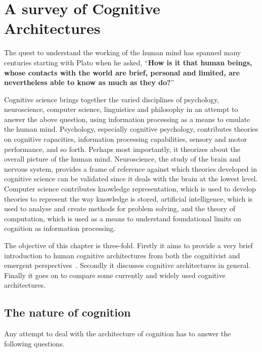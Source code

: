 \chapter{A survey of Cognitive Architectures}
\label{The_nature_of_cognition}
\newcommand{\soar}{{\small Soar\ }}
\newcommand{\actr}{{\small ACT-R\ }}
\newcommand{\epic}{{\small EPIC\ }}
\newcommand{\clarion}{{\small CLARION\ }}
The quest to understand the working of the human mind has spanned
many centuries starting with Plato when he asked, 
%
%
``{\bf How is it that human beings, whose contacts with the world are
  brief, personal and limited, are nevertheless able to know as much
  as they do?}''~\cite{Bogdan:1993aa}

Cognitive science brings together the varied disciplines of
psychology, neuroscience, computer science, linguistics and philosophy
in an attempt to answer the above question, using information
processing as a means to emulate the human mind. Psychology,
especially cognitive psychology, contributes theories on cognitive
capacities, information processing capabilities, sensory and motor
performance, and so forth.  Perhaps most importantly, it theorizes
about the overall picture of the human mind. Neuroscience, the study
of the brain and nervous system, provides a frame of reference against
which theories developed in cognitive science can be validated since
it deals with the brain at the lowest level.
% 
%
Computer science contributes knowledge representation, which is used
to develop theories to represent the way knowledge is stored,
artificial intelligence, which is used to analyse and create methods
for problem solving, and the theory of computation, which is used as a
means to understand foundational limits on cognition as
information processing.

The objective of this chapter is three-fold.  Firstly it aims to
provide a very brief introduction to human cognitive architectures
from both the cognitivist and emergent
perspectives~\cite{DBLP:journals/tec/VernonMS07}.  Secondly it
discusses cognitive architectures in general.  Finally it goes on to
compare some currently and widely used cognitive architectures.

\section{The nature of cognition}
\label{nature_Of_Cognition}
Any attempt to deal with the architecture of cognition has to answer
the following questions.

